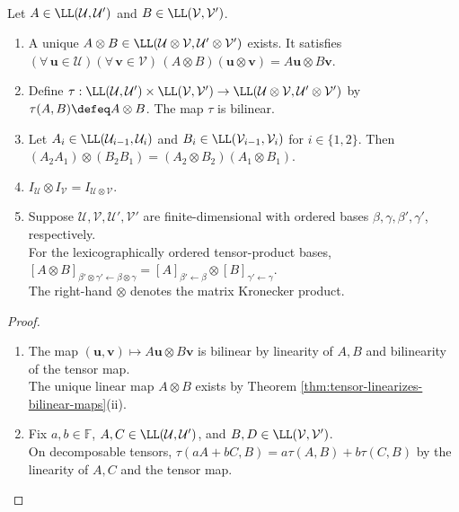 \begin{theorem} \label{thm:tensor-product-of-linear-maps} \\
Let $A\in\LL(\mathcal{U},\mathcal{U}')$ and $B\in\LL(\mathcal{V},\mathcal{V}')$.
\begin{enumerate}[label=(\roman*)]
\setlength{\itemsep}{0pt}
\item A unique $A\otimes B\in\LL(\mathcal{U}\otimes\mathcal{V},\mathcal{U}'\otimes\mathcal{V}')$ exists. It satisfies $(\forall\,\mathbf{u}\in\mathcal{U})(\forall\,\mathbf{v}\in\mathcal{V})\,(A\otimes B)(\mathbf{u}\otimes\mathbf{v})=A\mathbf{u}\otimes B\mathbf{v}$.
\item Define $\tau:\LL(\mathcal{U},\mathcal{U}')\times\LL(\mathcal{V},\mathcal{V}')\to\LL(\mathcal{U}\otimes\mathcal{V},\mathcal{U}'\otimes\mathcal{V}')$ by $\tau(A,B)\defeq A\otimes B$. The map $\tau$ is bilinear.
\item Let $A_i\in\LL(\mathcal{U}_{i-1},\mathcal{U}_i)$ and $B_i\in\LL(\mathcal{V}_{i-1},\mathcal{V}_i)$ for $i\in\{1,2\}$. Then $(A_2A_1)\otimes(B_2B_1)=(A_2\otimes B_2)(A_1\otimes B_1)$.
\item $I_{\mathcal{U}}\otimes I_{\mathcal{V}}=I_{\mathcal{U}\otimes\mathcal{V}}$.
\item Suppose $\mathcal{U},\mathcal{V},\mathcal{U}',\mathcal{V}'$ are finite-dimensional with ordered bases $\beta,\gamma,\beta',\gamma'$, respectively.\\
For the lexicographically ordered tensor-product bases, $[A\otimes B]_{\beta'\otimes\gamma'\leftarrow\beta\otimes\gamma}=[A]_{\beta'\leftarrow\beta}\otimes[B]_{\gamma'\leftarrow\gamma}$.\\
The right-hand $\otimes$ denotes the matrix Kronecker product.
\end{enumerate}
\begin{proof}
\begin{enumerate}[label=(\roman*)]
\setlength{\itemsep}{0pt}
\item The map $(\mathbf{u},\mathbf{v})\mapsto A\mathbf{u}\otimes B\mathbf{v}$ is bilinear by linearity of $A,B$ and bilinearity of the tensor map.\\
The unique linear map $A\otimes B$ exists by Theorem \ref{thm:tensor-linearizes-bilinear-maps}(ii).
\item Fix $a,b\in\mathbb{F}$, $A,C\in\LL(\mathcal{U},\mathcal{U}')$, and $B,D\in\LL(\mathcal{V},\mathcal{V}')$.\\
On decomposable tensors, $\tau(aA+bC,B)=a\tau(A,B)+b\tau(C,B)$ by the linearity of $A,C$ and the tensor map.\\

\end{enumerate}
\end{proof}
\end{theorem}

